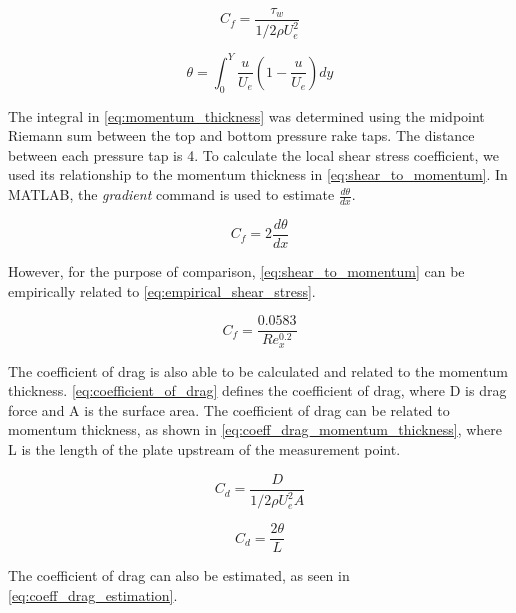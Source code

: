 \begin{equation} \label{eq:shear_stress_coefficient}
    C_f = \frac{\tau_w}{1/2 \rho U_e^2}
\end{equation}

\begin{equation} \label{eq:momentum_thickness}
    \theta = \int_0^Y\frac{u}{U_e}\left(1 - \frac{u}{U_e}\right)dy
\end{equation}

\noindent  The integral in \autoref{eq:momentum_thickness} was determined using the midpoint Riemann sum between the top and bottom pressure rake taps. The distance between each pressure tap is \num{4}\unit{}. To calculate the local shear stress coefficient, we used its relationship to the momentum thickness in \autoref{eq:shear_to_momentum}. In MATLAB, the \textit{gradient} command is used to estimate $\frac{d\theta}{dx}$.

\begin{equation} \label{eq:shear_to_momentum}
    C_f = 2\frac{d\theta}{dx}
\end{equation}

\noindent However, for the purpose of comparison, \autoref{eq:shear_to_momentum} can be empirically related to \autoref{eq:empirical_shear_stress}.

\begin{equation} \label{eq:empirical_shear_stress}
    C_f = \frac{0.0583}{Re_x^{0.2}}
\end{equation}

\noindent The coefficient of drag is also able to be calculated and related to the momentum thickness. \autoref{eq:coefficient_of_drag} defines the coefficient of drag, where \gls{D} is drag force and \gls{A} is the surface area. The coefficient of drag can be related to momentum thickness, as shown in \autoref{eq:coeff_drag_momentum_thickness}, where \gls{L} is the length of the plate upstream of the measurement point. 


\begin{equation} \label{eq:coefficient_of_drag}
    C_d = \frac{D}{1/2 \rho U_e^2 A}
\end{equation}

\begin{equation} \label{eq:coeff_drag_momentum_thickness}
    C_d = \frac{2\theta}{L}
\end{equation}

\noindent The coefficient of drag can also be estimated, as seen in \autoref{eq:coeff_drag_estimation}.

